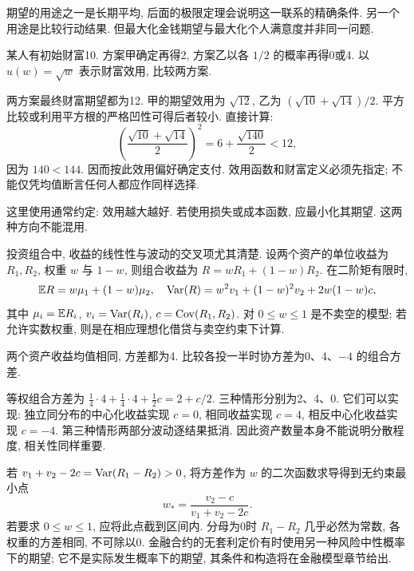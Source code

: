 期望的用途之一是长期平均, 后面的极限定理会说明这一联系的精确条件. 另一个用途是比较行动结果. 但最大化金钱期望与最大化个人满意度并非同一问题.
\begin{example}
某人有初始财富10. 方案甲确定再得2, 方案乙以各 $1/2$ 的概率再得0或4. 以 $u(w)=\sqrt w$ 表示财富效用, 比较两方案.
\end{example}
\begin{solution}
两方案最终财富期望都为12. 甲的期望效用为 $\sqrt{12}$, 乙为 $(\sqrt{10}+\sqrt{14})/2$. 平方比较或利用平方根的严格凹性可得后者较小. 直接计算:
\[
\left(\frac{\sqrt{10}+\sqrt{14}}2\right)^2=6+\frac{\sqrt{140}}2<12,
\]
因为 $140<144$. 因而按此效用偏好确定支付. 效用函数和财富定义必须先指定; 不能仅凭均值断言任何人都应作同样选择.
\end{solution}
这里使用通常约定: 效用越大越好. 若使用损失或成本函数, 应最小化其期望. 这两种方向不能混用.

投资组合中, 收益的线性性与波动的交叉项尤其清楚. 设两个资产的单位收益为 $R_1,R_2$, 权重 $w$ 与 $1-w$, 则组合收益为 $R=wR_1+(1-w)R_2$. 在二阶矩有限时,
\[
\mathbb E R=w\mu_1+(1-w)\mu_2,
\quad\operatorname{Var}(R)=w^2v_1+(1-w)^2v_2+2w(1-w)c,
\]
其中 $\mu_i=\mathbb E R_i$, $v_i=\operatorname{Var}(R_i)$, $c=\operatorname{Cov}(R_1,R_2)$. 对 $0\le w\le1$ 是不卖空的模型; 若允许实数权重, 则是在相应理想化借贷与卖空约束下计算.
\begin{example}
两个资产收益均值相同, 方差都为4. 比较各投一半时协方差为0、4、$-4$ 的组合方差.
\end{example}
\begin{solution}
等权组合方差为 $\tfrac14\cdot4+\tfrac14\cdot4+\tfrac12c=2+c/2$. 三种情形分别为2、4、0. 它们可以实现: 独立同分布的中心化收益实现 $c=0$, 相同收益实现 $c=4$, 相反中心化收益实现 $c=-4$. 第三种情形两部分波动逐结果抵消. 因此资产数量本身不能说明分散程度, 相关性同样重要.
\end{solution}
若 $v_1+v_2-2c=\operatorname{Var}(R_1-R_2)>0$, 将方差作为 $w$ 的二次函数求导得到无约束最小点
\[
w_* =\frac{v_2-c}{v_1+v_2-2c}.
\]
若要求 $0\le w\le1$, 应将此点截到区间内. 分母为0时 $R_1-R_2$ 几乎必然为常数, 各权重的方差相同, 不可除以0. 金融合约的无套利定价有时使用另一种风险中性概率下的期望; 它不是实际发生概率下的期望, 其条件和构造将在金融模型章节给出.

